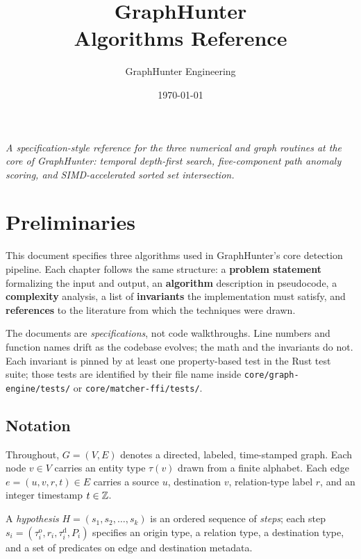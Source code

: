 \documentclass[11pt,openany]{book}
\title{\bfseries GraphHunter\\[0.6em]\Large Algorithms Reference}
\author{GraphHunter Engineering}
\date{\today}
\begin{document}
\frontmatter
\maketitle

\begin{center}
\vspace*{2em}
\small
\textit{A specification-style reference for the three numerical and
graph routines at the core of GraphHunter: temporal depth-first
search, five-component path anomaly scoring, and SIMD-accelerated
sorted set intersection.}
\end{center}

\cleardoublepage
\tableofcontents

\mainmatter

\chapter{Preliminaries}
\label{chap:preliminaries}

This document specifies three algorithms used in GraphHunter's core
detection pipeline. Each chapter follows the same structure: a
\textbf{problem statement} formalizing the input and output, an
\textbf{algorithm} description in pseudocode, a \textbf{complexity}
analysis, a list of \textbf{invariants} the implementation must
satisfy, and \textbf{references} to the literature from which the
techniques were drawn.

The documents are \emph{specifications}, not code walkthroughs. Line
numbers and function names drift as the codebase evolves; the math
and the invariants do not. Each invariant is pinned by at least one
property-based test in the Rust test suite; those tests are identified
by their file name inside \texttt{core/graph-engine/tests/} or
\texttt{core/matcher-ffi/tests/}.

\section*{Notation}

Throughout, $G = (V, E)$ denotes a directed, labeled, time-stamped
graph. Each node $v \in V$ carries an entity type $\tau(v)$ drawn
from a finite alphabet. Each edge $e = (u, v, r, t) \in E$ carries
a source $u$, destination $v$, relation-type label $r$, and an
integer timestamp $t \in \mathbb{Z}$.

A \emph{hypothesis} $H = (s_1, s_2, \dots, s_k)$ is an ordered
sequence of \emph{steps}; each step $s_i = (\tau^{\mathrm{o}}_i,
r_i, \tau^{\mathrm{d}}_i, P_i)$ specifies an origin type, a
relation type, a destination type, and a set of predicates on
edge and destination metadata.
\end{document}

